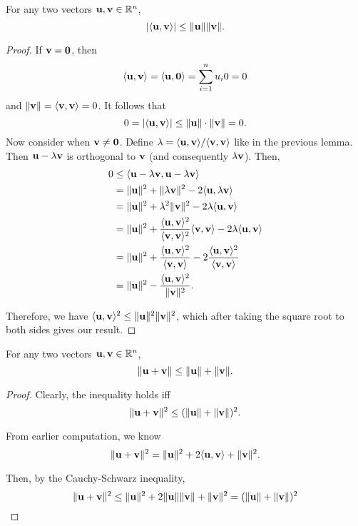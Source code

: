 \documentclass[letterpaper, twoside, 12pt]{book}
\begin{document}
\begin{theorem}
  For any two vectors \(\mathbf u,\mathbf v\in\mathbb R^n\),
  \[
    |\langle\mathbf u,\mathbf v\rangle|
      \leq
    \|\mathbf u\|\|\mathbf v\|
  .\]
\end{theorem}

\begin{proof}
    If \(\mathbf v = \mathbf 0\), then 
    \[ \langle \mathbf u, \mathbf v \rangle  = \langle \mathbf u, \mathbf 0\rangle = \sum_{i = 1}^n u_i 0 = 0 \]
    and \(\|\mathbf v\| = \langle\mathbf v, \mathbf v\rangle = 0 \). It follows that
    \[ 0 = | \langle \mathbf u, \mathbf v \rangle | \leq \|\mathbf u\| \cdot \|\mathbf v \| = 0 .\]
    Now consider when \(\mathbf v \neq \mathbf 0\). Define 
    \(\lambda = \langle\mathbf u, \mathbf v\rangle / \langle \mathbf v, \mathbf v\rangle\) like in the previous
    lemma. Then \(\mathbf u - \lambda \mathbf v\) is orthogonal to \(\mathbf v\) (and
    consequently \(\lambda \mathbf v\)). Then,
    \begin{align*} 
        0 &\leq \langle\mathbf u - \lambda \mathbf v, \mathbf u - \lambda \mathbf v \rangle \\
          &= \|\mathbf u\|^2 + \|\lambda \mathbf v\|^2 - 2\langle\mathbf u, \mathbf \lambda \mathbf v \rangle \\
          &= \|\mathbf u\|^2 + \lambda^2 \|\mathbf v\|^2 - 2 \lambda \langle\mathbf u, \mathbf v \rangle \\ 
          &= \|\mathbf u\|^2 + \frac{\langle\mathbf u, \mathbf v\rangle^2}{\langle\mathbf v, \mathbf v\rangle^2} \langle\mathbf v, \mathbf v\rangle - 2\lambda \langle\mathbf u, \mathbf v\rangle \\
          &= \|\mathbf u\|^2 + \frac{\langle\mathbf u, \mathbf v\rangle^2}{\langle\mathbf v, \mathbf v\rangle} - 2 \frac{\langle\mathbf u, \mathbf v\rangle^2}{\langle\mathbf v, \mathbf v\rangle} \\
          &= \|\mathbf u\|^2 - \frac{\langle\mathbf u, \mathbf v\rangle^2}{\|\mathbf v\|^2}. \\
    \end{align*}

    Therefore, we have \(\langle\mathbf u, \mathbf v\rangle^2 \leq \|\mathbf u\|^2 \|\mathbf v\|^2 \), which
    after taking the square root to both sides gives our result.
\end{proof}

\begin{theorem}
  For any two vectors \(\mathbf u,\mathbf v\in\mathbb R^n\),
  \[
    \|\mathbf u+\mathbf v\|
      \leq
    \|\mathbf u\|+\|\mathbf v\|
  .\]
\end{theorem}

\begin{proof}
    Clearly, the inequality holds iff 
    \[ \|\mathbf u + \mathbf v\|^2 \leq (\|\mathbf u \| + \|\mathbf v\|)^2 .\]

    From earlier computation, we know
    \[ \|\mathbf u + \mathbf v\|^2 = \|\mathbf u\|^2 + 2\langle\mathbf u, \mathbf v\rangle + \|\mathbf v\|^2 .\]

    Then, by the Cauchy-Schwarz inequality,
    \[ \|\mathbf u + \mathbf v\|^2 \leq 
        \|\mathbf u\|^2 + 2\|\mathbf u\|\|\mathbf v\| + \|\mathbf v \|^2 
        = (\|\mathbf u\| + \|\mathbf v\|)^2 \]
\end{proof}
\end{document}
